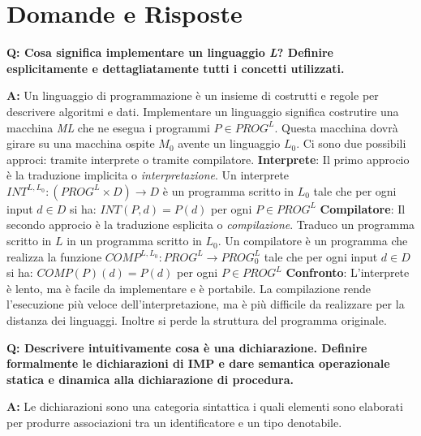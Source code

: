 \documentclass[a4paper]{article}
\newenvironment{qanda}{\setlength{\parindent}{0pt}}{\bigskip}
\newcommand{\Q}{\bigskip\bfseries Q: }
\newcommand{\A}{\par\textbf{A:} \normalfont}
\begin{document}
\pagebreak
\section{Domande e Risposte}
\begin{qanda}
	 
	\Q Cosa significa implementare un linguaggio \emph{L}? Definire esplicitamente e dettagliatamente tutti i concetti utilizzati.
	
	\A Un linguaggio di programmazione è un insieme di costrutti e regole per descrivere algoritmi e dati. 
	Implementare un linguaggio significa costrutire una macchina \emph{ML} che ne esegua i programmi $P \in PROG^L$.
	Questa macchina dovrà girare su una macchina ospite $M_0$ avente un linguaggio $L_0$. Ci sono due possibili approci: tramite interprete o tramite compilatore.
	\newline
	\newline
	\textbf{Interprete}: Il primo approcio è la traduzione implicita o \emph{interpretazione}. Un interprete $INT ^{L,L_0} : (PROG^L \times D) \to D$ è un programma
	scritto in $L_0$ tale che per ogni input $d \in D$ si ha: $INT(P,d) = P(d)$ per ogni $P \in PROG^L$
	\newline
	\newline
	\textbf{Compilatore}: Il secondo approcio è la traduzione esplicita o \emph{compilazione}. Traduco un programma scritto in $L$ in un programma scritto in $L_0$.
	Un compilatore è un programma che realizza la funzione $COMP^{L,L_0}:PROG^L \to PROG^L_0$ tale che per ogni input $d \in D$ si ha: 
	$COMP(P)(d) = P(d)$ per ogni $P \in PROG^L$
	\newline
	\newline
	\textbf{Confronto}: L'interprete è lento, ma è facile da implementare e è portabile. La compilazione rende l'esecuzione più veloce dell'interpretazione, ma è più difficile
	da realizzare per la distanza dei linguaggi. Inoltre si perde la struttura del programma originale.
	\newline
    \newline
    
\end{qanda}
\begin{qanda}
	\Q Descrivere intuitivamente cosa è una dichiarazione. Definire formalmente le dichiarazioni di IMP e dare semantica operazionale statica e dinamica alla dichiarazione di procedura.
	
	\A Le dichiarazioni sono una categoria sintattica i quali elementi sono elaborati per produrre associazioni tra un identificatore e un tipo denotabile.
	\newline
	\newline
	
\end{qanda}
\end{document}
